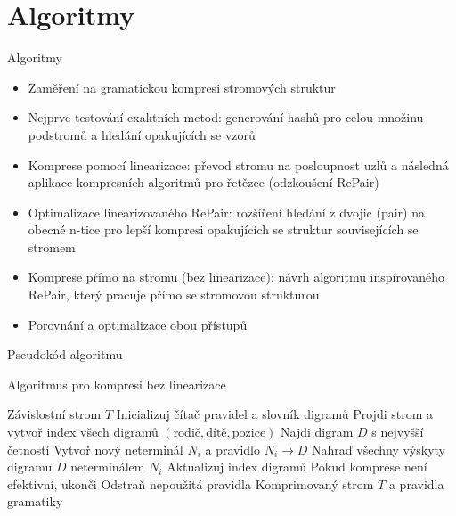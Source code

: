 \documentclass[lualatex,hyperref={pdfencoding=auto}]{beamer}
\begin{document}
\section{Algoritmy}
\begin{frame}{Algoritmy}
    \nocite{lohrey2015grammar}
    \nocite{lohrey2013xml}
    \nocite{lohrey2011tree}
  \begin{itemize}
    \item Zaměření na gramatickou kompresi stromových struktur
    \item Nejprve testování exaktních metod: generování hashů pro celou množinu podstromů a hledání opakujících se vzorů
    \item Komprese pomocí linearizace: převod stromu na posloupnost uzlů a následná aplikace kompresních algoritmů pro řetězce (odzkoušení RePair) \nocite{McAnlis2016}
    \item Optimalizace linearizovaného RePair: rozšíření hledání z dvojic (pair) na obecné n-tice pro lepší kompresi opakujících se struktur souvisejících se stromem
    \item Komprese přímo na stromu (bez linearizace): návrh algoritmu inspirovaného RePair, který pracuje přímo se stromovou strukturou
    \item Porovnání a optimalizace obou přístupů
  \end{itemize}
\end{frame}

\begin{frame}{Pseudokód algoritmu}
\begin{algorithm}[H]
\caption{Algoritmus pro kompresi bez linearizace} 
\begin{algorithmic}[1] 
  \REQUIRE Závislostní strom $T$ 
  \STATE Inicializuj čítač pravidel a slovník digramů 
  \STATE Projdi strom a vytvoř index všech digramů $(\text{rodič}, \text{dítě}, \text{pozice})$ 
  \STATE Najdi digram $D$ s nejvyšší četností 
  \STATE Vytvoř nový neterminál $N_i$ a pravidlo $N_i 
  \rightarrow D$ 
  \STATE Nahraď všechny výskyty digramu $D$ neterminálem $N_i$ 
  \STATE Aktualizuj index digramů 
  \STATE Pokud komprese není efektivní, ukonči 
  \ENDWHILE 
  \STATE Odstraň nepoužitá pravidla 
  \RETURN Komprimovaný strom $T$ a pravidla gramatiky 
\end{algorithmic} 
\end{algorithm}

\end{frame}
\end{document}
